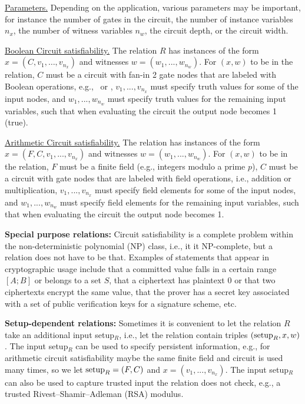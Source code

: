 \underline{Parameters.} Depending on the application, various parameters may be important, for instance the number of gates in the circuit, the number of instance variables $n_x$, the number of witness variables $n_w$, the circuit depth, or the circuit width.
 
\underline{Boolean Circuit satisfiability.} 
	The relation $R$ has instances of the form $x = (C, v_1, \ldots, v_{n_x})$ and witnesses $w = (w_1,...,w_{n_w})$. 
	For $(x,w)$ to be in the relation, $C$ must be a circuit with fan-in 2 gate nodes 
that are labeled with Boolean operations, e.g., \XOR\ or \AND, $v_1,...,v_{n_x}$ must specify 
truth values for some of the input nodes, and $w_1,...,w_{n_w}$ must specify 
truth values for the remaining input variables, such that when evaluating the circuit the output node becomes 1 (true).
 
\underline{Arithmetic Circuit satisfiability.} 
	The relation has instances of the form $x = (F, C, v_1,...,v_{n_x})$ and witnesses $w = (w_1,...,w_{n_w})$.
	For $(x,w)$ to be in the relation, $F$ must be a finite field (e.g., integers modulo a prime $p$), $C$ must be a circuit with gate nodes that are labeled with field operations, i.e., addition or multiplication, $v_1,...,v_{n_x}$ must specify field elements for some of the input nodes, and $w_1,...,w_{n_w}$ must specify field elements for the remaining input variables, such that when evaluating the circuit the output node becomes 1.
 

 
\textbf{Special purpose relations:} Circuit satisfiability is 
a complete problem within the non-deterministic polynomial (NP) class,
i.e., it it NP-complete,
but a relation does not have to be that. 
	Examples of statements that appear in cryptographic usage include that a committed value falls in a certain range $[A;B]$ or belongs to a set $S$, that a ciphertext has plaintext 0 or that two ciphertexts encrypt the same value, that the prover has a secret key associated with a set of public verification keys for a signature scheme, etc.
 
\textbf{Setup-dependent relations:} 
Sometimes it is convenient to let the relation $R$ take an additional input setup$_R$, i.e., let the relation contain triples $(\textmd{setup}_R, x, w)$. 
	The input setup$_R$ can be used to specify persistent information, e.g., 
for arithmetic circuit satisfiability maybe the same finite field and circuit is used many times, 
so we let $\textmd{setup}_R = (F, C)$ and $x = (v_1,...,v_{n_x})$.
	The input setup$_R$ can also be used to capture trusted input the relation does not check, 
e.g., a trusted Rivest--Shamir--Adleman (RSA)
modulus.

